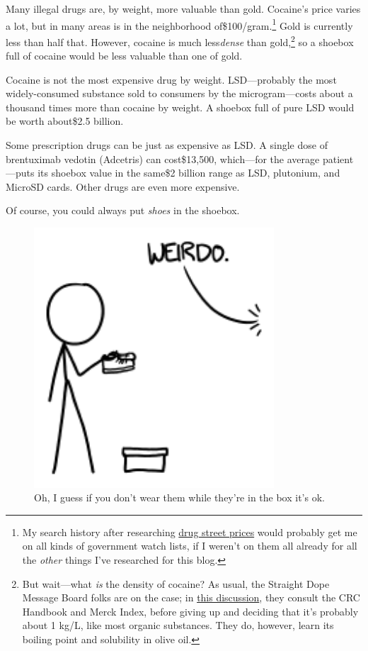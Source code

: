 {{Many illegal drugs are, by weight, more valuable than gold. Cocaine's price varies a lot, but in many areas is in the neighborhood of\$100/gram.{\footnote{My search history after researching \href{http://www.havocscope.com/black-market-prices/cocaine-prices/}{drug street prices} would probably get me on all kinds of government watch lists, if I weren't on them all already for all the \emph{other} things I've researched for this blog.} } Gold is currently less than half that. However, cocaine is much less\emph{dense} than gold,{\footnote{But wait—what \emph{is} the density of cocaine? As usual, the Straight Dope Message Board folks are on the case; in \href{http://boards.straightdope.com/sdmb/showthread.php?t=298784} {this discussion}, they consult the CRC Handbook and Merck Index, before giving up and deciding that it's probably about 1 kg/L, like most organic substances. They do, however, learn its boiling point and solubility in olive oil.} } so a shoebox full of cocaine would be less valuable than one of gold.}

{Cocaine is not the most expensive drug by weight. LSD—probably the most widely-consumed substance sold to consumers by the microgram—costs about a thousand times more than cocaine by weight. A shoebox full of pure LSD would be worth about\$2.5 billion.}

{Some prescription drugs can be just as expensive as LSD. A single dose of brentuximab vedotin (Adcetris) can cost\$13,500, which—for the average patient—puts its shoebox value in the same\$2 billion range as LSD, plutonium, and MicroSD cards. Other drugs are even more expensive.}

{Of course, you could always put \emph{shoes} in the shoebox.}

\begin{figure}[!htbp]
\centering
\includegraphics[scale=0.5, max width=0.8\textwidth]{imgs/a/108/weird.png}
\caption{Oh, I guess if you don't wear them while they're in the box it's ok.}
\end{figure}

}
